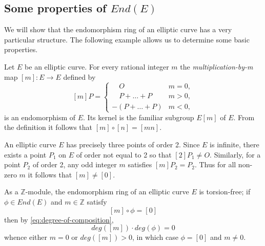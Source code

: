 \subsection{Some properties of $End(E)$}
\label{sec:some-properties-ende}

We will show that the endomorphism ring of an elliptic curve has a very particular
structure.  The following example allows us to determine some basic properties.

\begin{example}
  \label{ex:mult-by-m}
  Let $E$ be an elliptic curve.  For every rational integer $m$ the \emph{multiplication-by-m}
  map $\left[m\right] \colon E \rightarrow E$ defined by
  \begin{equation*}
    \left[ m \right] P =
    \begin{cases}
      \quad O & m = 0,\\
      \quad P + \ldots + P & m > 0,\\
      - \left( P + \ldots + P \right) & m < 0,
    \end{cases}
  \end{equation*}
  is an endomorphism of $E$.  Its kernel is the familiar subgroup $E \left[ m
  \right]$ of $E$.  From the definition it follows that $\left[m\right]
  \circ \left[n\right] = \left[mn\right]$.  
\end{example}

An elliptic curve $E$ has precisely three points of order 2.  Since $E$ is infinite,
there exists a point $P_{1}$ on $E$ of order not equal to 2 so that
$\left[2\right]P_{1} \neq O$.  Similarly, for a point $P_{2}$ of order 2, any odd
integer $m$ satisfies $\left[m\right]P_{2} = P_{2}$.  Thus for all non-zero $m$ it
follows that $\left[m\right] \neq \left[0\right]$.

As a $\mathbb{Z}$-module, the endomorphism ring of an elliptic curve $E$ is torsion-free; if $\phi \in
End(E)$ and $m \in \mathbb{Z}$ satisfy
\begin{equation*}
  \left[m\right] \circ \phi = \left[ 0 \right]
\end{equation*}
then by \eqref{eq:degree-of-composition},
\begin{equation*}
  deg \left(\left[m\right]\right) \cdot deg \left( \phi \right) = 0
\end{equation*}
whence either $m = 0$ or $deg\left(\left[m\right]\right) > 0$, in which case $\phi =
\left[0\right]$ and $m \neq 0$.

